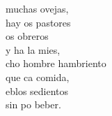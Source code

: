 \begin{cancion}%
	 muchas ovejas,\\
	hay os pastores\\
	os obreros\\
	y ha la mies,\\
	cho hombre hambriento\\
	que ca comida,\\
	eblos sedientos \\
	sin po beber.\\
\end{cancion}%
